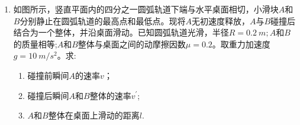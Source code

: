 \begin{enumerate}[leftmargin=0em]
\begin{enumerate}
\end{enumerate}
\begin{figure}[h!]
\flushright

\end{figure}



\item 
{}
如图所示，竖直平面内的四分之一圆弧轨道下端与水平桌面相切，小滑块$ A $和$ B $分别静止在圆弧轨道的最高点和最低点。现将$ A $无初速度释放，$ A $与$ B $碰撞后结合为一个整体，并沿桌面滑动。已知圆弧轨道光滑，半径$ R=0.2\ m;A $和$ B $的质量相等;$ A $和$ B $整体与桌面之间的动摩擦因数$ \mu =0.2 $。取重力加速度$ g=10 \ m/s^{2} $。求$ : $
\begin{enumerate}
\renewcommand{\labelenumi}{\arabic{enumi}.}
\item
碰撞前瞬间$ A $的速率$ v $；
\item 
碰撞后瞬间$ A $和$ B $整体的速率$ v ^{\prime} $;
\item 
$ A $和$ B $整体在桌面上滑动的距离$ l $.
\end{enumerate}
\begin{figure}[h!]
\flushright

\end{figure}



\end{enumerate}
